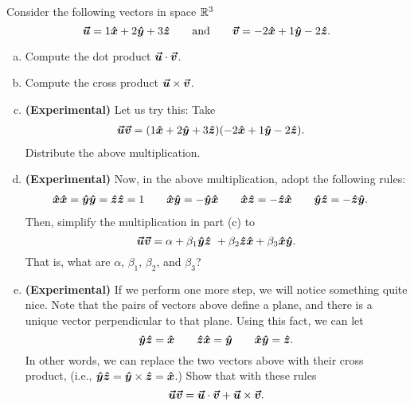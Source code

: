 \documentclass[12pt]{article} %
\begin{document}
\newpage
\begin{problem}
Consider the following vectors in space $\R^3$
\[
\vecu = 1\xhat + 2\yhat + 3\zhat \qquad \textrm{and} \qquad \vecv = -2\xhat +1\yhat -2\zhat.
\]
\begin{enumerate}[(a)]
    \item Compute the dot product $\vecu\cdot \vecv$. 
    \item Compute the cross product $\vecu \times \vecv$.
    \item \textbf{(Experimental)} Let us try this: Take
    \begin{align*}
        \vecu \vecv &= (1\xhat + 2\yhat + 3\zhat)(-2\xhat + 1\yhat -2\zhat).
    \end{align*}
    Distribute the above multiplication.
    \item \textbf{(Experimental)} Now, in the above multiplication, adopt the following rules:
    \begin{align*}
        \xhat \xhat = \yhat \yhat = \zhat \zhat &= 1 &&&
        \xhat \yhat &= - \yhat \xhat &&& \xhat \zhat &= - \zhat \xhat &&& \yhat \zhat &= -\zhat \yhat.
    \end{align*}
    Then, simplify the multiplication in part (c) to
    \[
    \vecu\vecv = \alpha + \beta_1 \yhat\zhat  \ + \beta_2 \zhat \xhat + \beta_3 \xhat \yhat. 
    \]
    That is, what are $\alpha$, $\beta_1$, $\beta_2$, and $\beta_3$?
    \item \textbf{(Experimental)} If we perform one more step, we will notice something quite nice.  Note that the pairs of vectors above define a plane, and there is a unique vector perpendicular to that plane.  Using this fact, we can let 
    \[
    \yhat \zhat = \xhat \qquad \zhat \xhat = \yhat \qquad \xhat \yhat = \zhat.
    \]
    In other words, we can replace the two vectors above with their cross product, (i.e., $\yhat \zhat = \yhat \times \zhat = \xhat$.) Show that with these rules
    \[
    \vecu \vecv = \vecu\cdot \vecv + \vecu \times \vecv.
    \]
\end{enumerate}
\end{problem}
\end{document}
